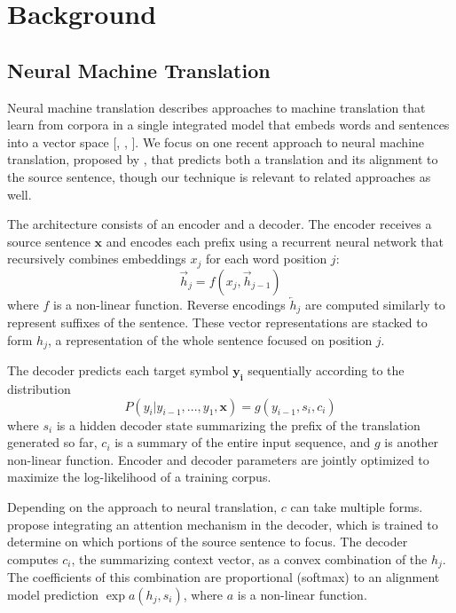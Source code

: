 \section{Background}
\label{sec:background}

\subsection{Neural Machine Translation}
Neural machine translation describes approaches to machine translation that
learn from corpora in a single integrated model that embeds words and sentences
into a vector space
[, , ].
We focus on one recent approach to neural machine translation, proposed
by , that predicts
both a translation and its alignment to the source sentence, though our technique is relevant to
related approaches as well.

The architecture consists of an encoder and a decoder. The encoder receives a
source sentence $\mathbf{x}$ and encodes each prefix using a recurrent neural
network that recursively combines embeddings $x_j$ for each word position $j$:
\begin{equation}
\overrightarrow{h}_{j} = f(x_{j}, \overrightarrow{h}_{j-1})
\end{equation}
where $f$ is a non-linear function. Reverse encodings $\overleftarrow{h}_j$ are
computed similarly to represent suffixes of the sentence. These vector
representations are stacked to form $h_j$, a representation of the whole
sentence focused on position $j$.

The decoder predicts each target symbol $\mathbf{y_i}$ sequentially according
to the distribution
\begin{equation}
P(y_{i} | y_{i-1}, ..., y_{1}, \mathbf{x}) = g(y_{i-1}, s_i, c_i)
\label{eqn:normalize}
\end{equation}
where $s_i$ is a hidden decoder state summarizing the prefix of the translation
generated so far, $c_i$ is a summary of the entire
input sequence, and $g$ is another non-linear function. Encoder and decoder
parameters are jointly optimized to maximize the log-likelihood of a training
corpus.

Depending on the approach to neural translation, $c$ can take multiple forms.
 propose integrating an attention mechanism
in the decoder, which is trained to determine on which portions of the source
sentence to focus. The decoder computes $c_{i}$, the summarizing context
vector, as a convex combination of the $h_{j}$. The coefficients of this
combination are proportional (softmax) to an alignment model prediction $\exp a(h_j,
s_i)$, where $a$ is a non-linear function.

